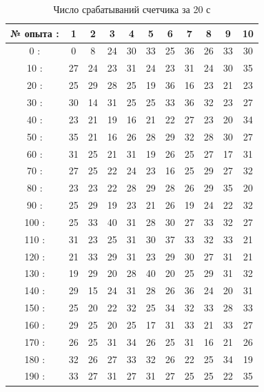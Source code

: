 \documentclass[a4paper,12pt]{article}
\begin{document}
\begin{table}[H]
\centering
\caption{Число срабатываний счетчика за 20 с}
\begin{tabular}{|c|c|c|c|c|c|c|c|c|c|c|}
\hline 
№ опыта : & 1 & 2 & 3 & 4 & 5 & 6 & 7 & 8 & 9 & 10 \\ 
\hline 
0 : & 0 & 8 & 24 & 30 & 33 & 25 & 36 & 26 & 33 & 30 \\ 
10 : & 27 & 24 & 23 & 31 & 24 & 23 & 31 & 24 & 30 & 35 \\ 
20 : & 25 & 29 & 28 & 25 & 19 & 36 & 16 & 23 & 21 & 23 \\ 
30 : & 30 & 14 & 31 & 25 & 25 & 33 & 36 & 32 & 23 & 27 \\ 
40 : & 23 & 21 & 19 & 16 & 21 & 22 & 27 & 23 & 20 & 34 \\ 
50 : & 35 & 21 & 16 & 26 & 28 & 29 & 32 & 28 & 30 & 27 \\ 
60 : & 31 & 25 & 21 & 31 & 19 & 26 & 25 & 27 & 17 & 31 \\
70 : & 27 & 25 & 22 & 24 & 23 & 16 & 25 & 29 & 27 & 32 \\ 
80 : & 23 & 23 & 22 & 28 & 29 & 28 & 26 & 29 & 35 & 20 \\ 
90 : & 25 & 29 & 19 & 23 & 21 & 26 & 19 & 24 & 22 & 32 \\ 
100 : & 25 & 33 & 40 & 31 & 28 & 30 & 27 & 33 & 32 & 27 \\ 
110 : & 31 & 23 & 25 & 31 & 30 & 37 & 33 & 32 & 33 & 21 \\ 
120 : & 21 & 33 & 29 & 31 & 23 & 29 & 30 & 27 & 31 & 21 \\ 
130 : & 19 & 29 & 20 & 28 & 40 & 20 & 25 & 29 & 31 & 32 \\ 
140 : & 29 & 15 & 24 & 31 & 28 & 26 & 36 & 24 & 20 & 31 \\ 
150 : & 25 & 20 & 22 & 32 & 25 & 34 & 32 & 33 & 28 & 33 \\ 
160 : & 29 & 25 & 20 & 25 & 17 & 31 & 33 & 21 & 33 & 27 \\ 
170 : & 26 & 25 & 31 & 34 & 26 & 25 & 31 & 16 & 21 & 26 \\ 
180 : & 32 & 26 & 27 & 33 & 32 & 26 & 22 & 25 & 34 & 19 \\ 
190 : & 33 & 27 & 31 & 27 & 31 & 27 & 25 & 25 & 22 & 35 \\ 
\hline 
\end{tabular} 
\end{table}
\end{document}
